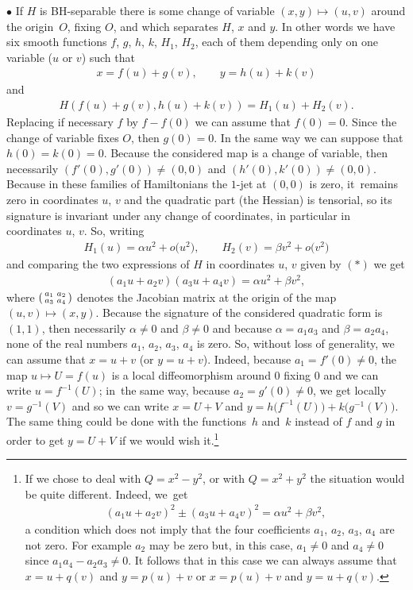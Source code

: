 \documentclass[10pt,a4paper]{amsart}
\numberwithin{equation}{section}
\begin{document}
$\bullet$ If $H$ is BH-separable
there is some change of variable $(x,y)\mapsto (u,v)$ around the origin~$O$, fixing $O$, and which separates $H$, $x$ and $y$. In other words we have six smooth functions $f$, $g$, $h$, $k$, $H_1$, $H_2$, each of them depending only on one variable ($u$ or $v$) such that
\begin{gather*}
x=f(u)+g(v),\qquad y=h(u)+k(v)
\end{gather*}
and
\begin{gather}
H(f(u)+g(v),h(u)+k(v))=H_1(u)+H_2(v)\tag{$*$}.
\end{gather}
Replacing if necessary $f$ by $f-f(0)$ we can assume that $f(0)=0$. Since the change of variable fixes $O$, then $g(0)=0$. In the same way we can suppose that $h(0)=k(0)=0$. Because the considered map is a change of variable, then necessarily $(f'(0),g'(0))\not=(0,0)$ and $(h'(0),k'(0))\not=(0,0)$.
Because in these families of Hamiltonians the $1$-jet at $(0,0)$ is zero, it~remains zero in coordinates $u$, $v$ and the quadratic part (the Hessian) is tensorial, so its signature is invariant under any change of coordinates, in particular in coordinates $u$, $v$. So, writing
\begin{gather*}
H_1(u)=\alpha u^2+o\big(u^2\big),\qquad H_2(v)=\beta v^2+o\big(v^2\big)
\end{gather*}
and comparing the two expressions of $H$ in coordinates $u$, $v$ given by $(*)$ we get
\begin{gather*}
(a_1u+a_2v)(a_3u+a_4v)=\alpha u^2+\beta v^2,
\end{gather*}
where
$\left(\begin{smallmatrix}
a_1&a_2\cr a_3& a_4
\end{smallmatrix}\right)$
denotes the Jacobian matrix at the origin of the map $(u,v)\mapsto(x,y)$.
Because the signature of the considered quadratic form is $(1,1)$, then necessarily $\alpha\not=0$ and $\beta\not=0$ and because $\alpha=a_1a_3$ and $\beta=a_2a_4$, none of the real numbers $a_1$, $a_2$, $a_3$, $a_4$ is zero. So, without loss of generality, we can assume that $x=u+v$ (or $y=u+v$). Indeed, because $a_1=f'(0)\not=0$, the map $u\mapsto U=f(u)$ is a local diffeomorphism around $0$ fixing $0$ and we can write $u=f^{-1}(U)$; in~the same way, because $a_2=g'(0)\not=0$, we get locally $v=g^{-1}(V)$ and so we can write $x=U+V$ and $y=h\big(f^{-1}(U)\big)+k\big(g^{-1}(V)\big)$. The same thing could be done with the functions~$h$ and~$k$ instead of $f$ and $g$ in order to get $y=U+V$ if we would wish it.\footnote{If we chose to deal with $Q=x^2-y^2$, or with $Q=x^2+y^2$ the situation would be quite different. Indeed, we~get
\begin{gather*}
(a_1u+a_2v)^2\pm(a_3u+a_4v)^2=\alpha u^2+\beta v^2,
\end{gather*}
	a condition which does not imply that the four coefficients $a_1$, $a_2$, $a_3$, $a_4$ are not zero. For example $a_2$ may be zero but, in this case, $a_1\not=0$ and $a_4\not=0$ since $a_1a_4-a_2a_3\not=0$. It follows that in this case we can always assume that $x=u+q(v)$ and $y=p(u)+v$ or $x=p(u)+v$ and $y=u+q(v)$.}
\end{document}
